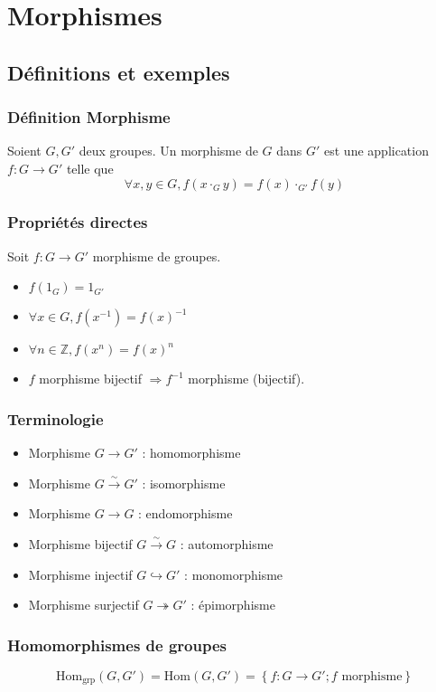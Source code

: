 \documentclass[a4paper,10pt]{report}
\newcommand{\set}[1]{\left\lbrace #1 \right\rbrace } %
\newcommand{\IZ}{\mathbb{Z}} %
\newcommand{\so}{\Rightarrow}
\newcommand{\inj}{\hookrightarrow}
\newcommand{\surj}{\twoheadrightarrow}
\newcommand{\bij}{\overset{\sim}{\to}} %
\begin{document}
 \chapter{Morphismes}
  \section{Définitions et exemples}
   \subsection{Définition Morphisme}
    Soient $G, G'$ deux groupes. Un morphisme de $G$ dans $G'$ est une
    application $f:G \to G'$ telle que
    $$\forall x,y \in G, f(x\cdot_G y) = f(x) \cdot_{G'} f(y)$$

   \subsection{Propriétés directes}
    Soit $f:G \to G'$ morphisme de groupes.
    \begin{itemize}
      \item $f(1_G)=1_{G'}$
      \item $\forall x \in G, f(x^{-1}) = f(x)^{-1}$
      \item $\forall n \in \IZ, f(x^n)=f(x)^n$
      \item $f$ morphisme bijectif $\so f^{-1}$ morphisme (bijectif).
    \end{itemize}
 
   \subsection{Terminologie}
    \begin{itemize}
      \item Morphisme $G \to G'$ : homomorphisme
      \item Morphisme $G \bij G'$ : isomorphisme
      \item Morphisme $G \to G$ : endomorphisme
      \item Morphisme bijectif $G \bij G$ : automorphisme
      \item Morphisme injectif $G \inj G'$ : monomorphisme
      \item Morphisme surjectif $G \surj G'$ : épimorphisme
    \end{itemize}

   \subsection{Homomorphismes de groupes}
    $$\text{Hom}_{\text{grp}}(G,G')=\text{Hom}(G,G')= \set{f: G \to G'; f
    \text{ morphisme}}$$
\end{document}
